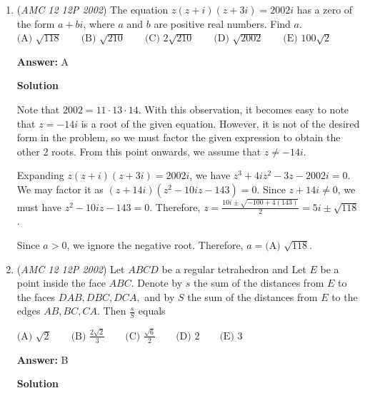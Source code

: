 \begin{enumerate}
 Thus, our answer is $6(0+1+0) + 2.5(24+24+25)=\boxed {\text{(D) }188.5}.$

 \textbf{Note} The conversion rate can either be $(c+5, u-12).$ or $(c-5, u+12).$ Both solutions use a different conversion rate to illustrate this point. The first solution defines the "first way" as the one with the most correct, while the second solution defines the "first way" as the one with the most unanswered.

 


	\item (\textit{AMC 12 12P 2002}) The equation $z(z+i)(z+3i)=2002i$ has a zero of the form $a+bi$, where $a$ and $b$ are positive real numbers. Find $a.$
$\text{(A) }\sqrt{118} \qquad \text{(B) }\sqrt{210} \qquad \text{(C) }2 \sqrt{210} \qquad \text{(D) }\sqrt{2002} \qquad \text{(E) }100 \sqrt{2}$

 \textbf{Answer: }A



\textbf{Solution}

Note that $2002 = 11 \cdot 13 \cdot 14$. With this observation, it becomes easy to note that $z = -14i$ is a root of the given equation. However, it is not of the desired form in the problem, so we must factor the given expression to obtain the other 2 roots. From this point onwards, we assume that $z \neq -14i$.

 Expanding $z(z+i)(z+3i)=2002i$, we have $z^3 + 4iz^2 - 3z - 2002i = 0$. We may factor it as $(z + 14i)(z^2 - 10iz - 143) = 0$. Since $z + 14i \neq 0$, we must have $z^2 - 10iz - 143 = 0$. Therefore, $z = \frac {10i \pm \sqrt{-100 + 4(143)}}{2} = 5i \pm \sqrt {118}$.

 Since $a > 0$, we ignore the negative root. Therefore, $a = \boxed {\text{(A) } \sqrt {118}}$.

 


	\item (\textit{AMC 12 12P 2002}) Let $ABCD$ be a regular tetrahedron and Let $E$ be a point inside the face $ABC.$ Denote by $s$ the sum of the distances from $E$ to the faces $DAB, DBC, DCA,$ and by $S$ the sum of the distances from $E$ to the edges $AB, BC, CA.$ Then $\frac{s}{S}$ equals


 $\text{(A) }\sqrt{2} \qquad \text{(B) }\frac{2 \sqrt{2}}{3} \qquad \text{(C) }\frac{\sqrt{6}}{2} \qquad \text{(D) }2 \qquad \text{(E) }3$

 \textbf{Answer: }B



\textbf{Solution}


\end{enumerate}
